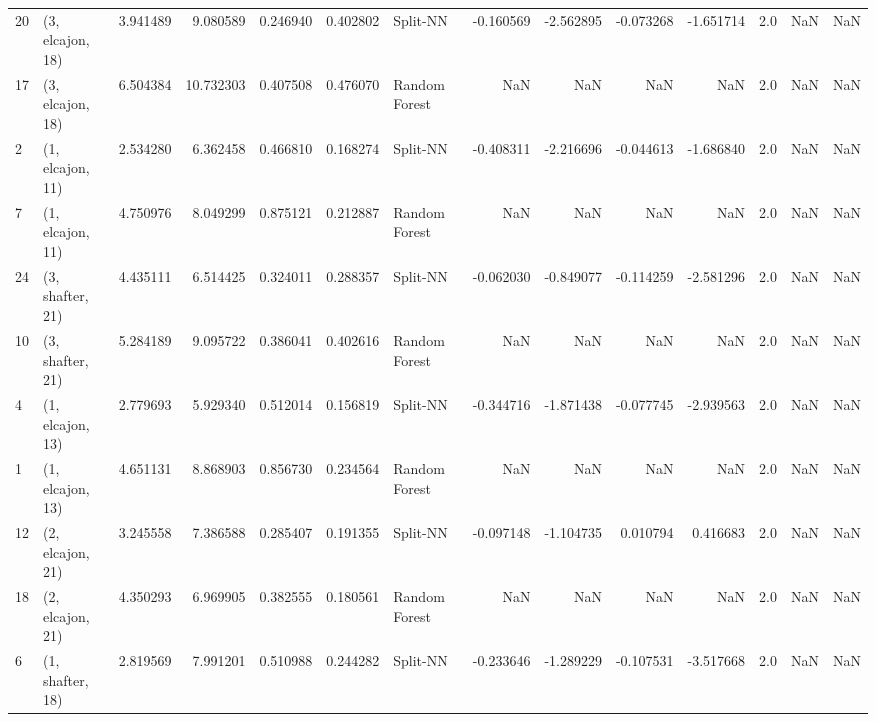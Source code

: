 \begin{tabular}{llrrrrlrrrrrrl}
20 &  (3, elcajon, 18) &   3.941489 &   9.080589 &   0.246940 &  0.402802 &       Split-NN &       -0.160569 &     -2.562895 &      -0.073268 &    -1.651714 &            2.0 &    NaN &              NaN \\
17 &  (3, elcajon, 18) &   6.504384 &  10.732303 &   0.407508 &  0.476070 &  Random Forest &             NaN &           NaN &            NaN &          NaN &            2.0 &    NaN &              NaN \\
2  &  (1, elcajon, 11) &   2.534280 &   6.362458 &   0.466810 &  0.168274 &       Split-NN &       -0.408311 &     -2.216696 &      -0.044613 &    -1.686840 &            2.0 &    NaN &              NaN \\
7  &  (1, elcajon, 11) &   4.750976 &   8.049299 &   0.875121 &  0.212887 &  Random Forest &             NaN &           NaN &            NaN &          NaN &            2.0 &    NaN &              NaN \\
24 &  (3, shafter, 21) &   4.435111 &   6.514425 &   0.324011 &  0.288357 &       Split-NN &       -0.062030 &     -0.849077 &      -0.114259 &    -2.581296 &            2.0 &    NaN &              NaN \\
10 &  (3, shafter, 21) &   5.284189 &   9.095722 &   0.386041 &  0.402616 &  Random Forest &             NaN &           NaN &            NaN &          NaN &            2.0 &    NaN &              NaN \\
4  &  (1, elcajon, 13) &   2.779693 &   5.929340 &   0.512014 &  0.156819 &       Split-NN &       -0.344716 &     -1.871438 &      -0.077745 &    -2.939563 &            2.0 &    NaN &              NaN \\
1  &  (1, elcajon, 13) &   4.651131 &   8.868903 &   0.856730 &  0.234564 &  Random Forest &             NaN &           NaN &            NaN &          NaN &            2.0 &    NaN &              NaN \\
12 &  (2, elcajon, 21) &   3.245558 &   7.386588 &   0.285407 &  0.191355 &       Split-NN &       -0.097148 &     -1.104735 &       0.010794 &     0.416683 &            2.0 &    NaN &              NaN \\
18 &  (2, elcajon, 21) &   4.350293 &   6.969905 &   0.382555 &  0.180561 &  Random Forest &             NaN &           NaN &            NaN &          NaN &            2.0 &    NaN &              NaN \\
6  &  (1, shafter, 18) &   2.819569 &   7.991201 &   0.510988 &  0.244282 &       Split-NN &       -0.233646 &     -1.289229 &      -0.107531 &    -3.517668 &            2.0 &    NaN &              NaN \\

\end{tabular}
